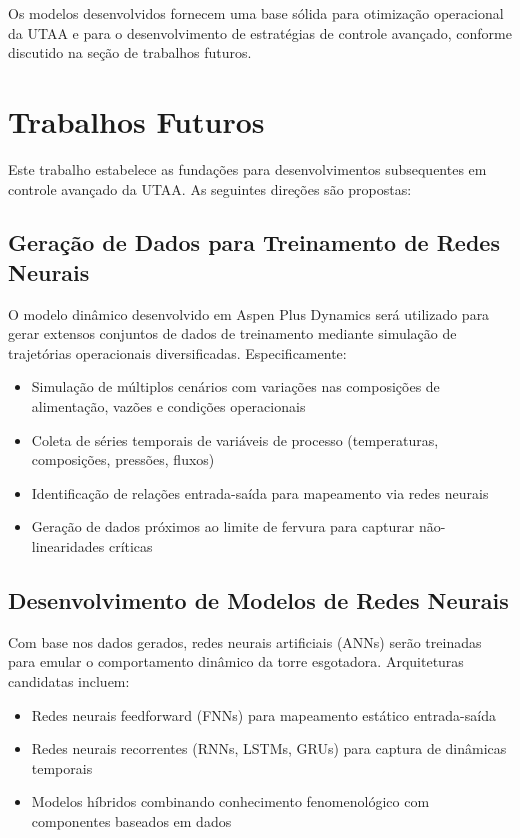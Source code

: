Os modelos desenvolvidos fornecem uma base sólida para otimização operacional da UTAA e para o desenvolvimento de estratégias de controle avançado, conforme discutido na seção de trabalhos futuros.

\section{Trabalhos Futuros}\label{sec:futuros}

Este trabalho estabelece as fundações para desenvolvimentos subsequentes em controle avançado da UTAA. As seguintes direções são propostas:

\subsection{Geração de Dados para Treinamento de Redes Neurais}

O modelo dinâmico desenvolvido em Aspen Plus Dynamics será utilizado para gerar extensos conjuntos de dados de treinamento mediante simulação de trajetórias operacionais diversificadas. Especificamente:

\begin{itemize}[leftmargin=*]
  \item Simulação de múltiplos cenários com variações nas composições de alimentação, vazões e condições operacionais
  \item Coleta de séries temporais de variáveis de processo (temperaturas, composições, pressões, fluxos)
  \item Identificação de relações entrada-saída para mapeamento via redes neurais
  \item Geração de dados próximos ao limite de fervura para capturar não-linearidades críticas
\end{itemize}

\subsection{Desenvolvimento de Modelos de Redes Neurais}

Com base nos dados gerados, redes neurais artificiais (ANNs) serão treinadas para emular o comportamento dinâmico da torre esgotadora. Arquiteturas candidatas incluem:

\begin{itemize}[leftmargin=*]
  \item Redes neurais feedforward (FNNs) para mapeamento estático entrada-saída
  \item Redes neurais recorrentes (RNNs, LSTMs, GRUs) para captura de dinâmicas temporais
  \item Modelos híbridos combinando conhecimento fenomenológico com componentes baseados em dados
\end{itemize}

